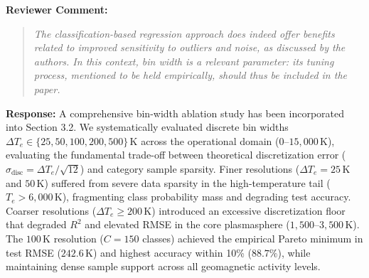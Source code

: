\documentclass[a4paper,12pt]{article}
\newcommand{\reviewercomment}[1]{%
  \begin{samepage}%
  \par\noindent\textbf{Reviewer Comment:}\par
  \begin{quote}\itshape #1\end{quote}}
\newcommand{\filledresponse}[1]{%
  \par\noindent\textbf{Response:} #1\par
  \vspace{0.4cm}%
  \end{samepage}}
\begin{document}
\reviewercomment{The classification-based regression approach does indeed offer benefits related to improved
sensitivity to outliers and noise, as discussed by the authors. In this context, bin width is a
relevant parameter: its tuning process, mentioned to be held empirically, should thus be included in
the paper.}
\filledresponse{A comprehensive bin-width ablation study has been incorporated into Section 3.2. We systematically evaluated discrete bin widths $\Delta T_e \in \{25, 50, 100, 200, 500\}$\,K across the operational domain ($0$--$15{,}000$\,K), evaluating the fundamental trade-off between theoretical discretization error ($\sigma_{\text{disc}} = \Delta T_e / \sqrt{12}$) and category sample sparsity. Finer resolutions ($\Delta T_e = 25$\,K and $50$\,K) suffered from severe data sparsity in the high-temperature tail ($T_e > 6{,}000$\,K), fragmenting class probability mass and degrading test accuracy. Coarser resolutions ($\Delta T_e \ge 200$\,K) introduced an excessive discretization floor that degraded $R^2$ and elevated RMSE in the core plasmasphere ($1{,}500$--$3{,}500$\,K). The $100$\,K resolution ($C = 150$ classes) achieved the empirical Pareto minimum in test RMSE ($242.6$\,K) and highest accuracy within 10\% ($88.7\%$), while maintaining dense sample support across all geomagnetic activity levels.}
\end{document}
